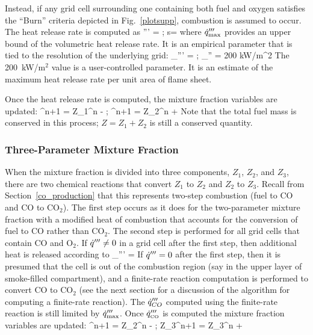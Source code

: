 \documentclass[11pt]{book}
\begin{document}
Instead, if any grid cell surrounding one containing both fuel and oxygen satisfies the ``Burn'' criteria depicted in Fig.~\ref{plotsupp},
combustion is assumed to occur.  The heat release rate is computed as
\be \dq''' = \min {}
  \quad ; \quad s=   \ee
where $\dot{q}_{\max}'''$ provides an upper bound of the volumetric heat release rate.
It is an empirical parameter that is tied to the resolution of the
underlying grid:
\be \dq_{\max}''' =   \quad ; \quad  \dq_{\max}'' = 200 \; \; \hbox{kW/m}^2  \ee
The 200~kW/m$^2$ value is a user-controlled parameter.  It is an estimate of the maximum heat release rate per unit area of flame sheet.

Once the heat release rate is computed, the mixture fraction variables are updated:
^{n+1} = {Z_1}^n -   \quad ; ^{n+1} =
{Z_2}^n +  \ee
Note that the total fuel mass is conserved in this process; $Z=Z_1+Z_2$ is still a conserved quantity.


\subsubsection{Three-Parameter Mixture Fraction}

When the mixture fraction is divided into three components, $Z_1$, $Z_2$, and $Z_3$, there are two chemical
reactions that convert $Z_1$ to $Z_2$ and $Z_2$ to $Z_3$.  Recall from Section~\ref{co_production}
that this represents two-step combustion (fuel to CO and CO to CO$_2$).
The first step occurs as it does for the two-parameter mixture fraction with a modified heat of combustion that
accounts for the conversion of fuel to CO rather than CO$_2$.
The second step is performed for all grid cells that contain CO and O$_2$.   If $\dot{q}''' \neq 0$ in a grid
cell after the first step, then additional heat is released according to
\be \dq_{\CO}''' = \min {}     \ee
If $\dot{q}'''=0$ after the first step, then it is presumed that the cell is out of the combustion region (say in the upper layer of
smoke-filled compartment), and a finite-rate reaction computation is performed to convert CO to CO$_2$ (see the next section for
a discussion of the algorithm for computing a finite-rate reaction).  The $\dot{q}'''_{CO}$ computed using the finite-rate
reaction is still limited by $\dot{q}_{\max}'''$.  Once $\dot{q}'''_{{\tiny \hbox{CO}}}$ is computed the mixture fraction variables are updated:
^{n+1} = {Z_2}^n -  \quad ; \quad
{Z_3}^{n+1} = {Z_3}^n +  \ee
\end{document}
